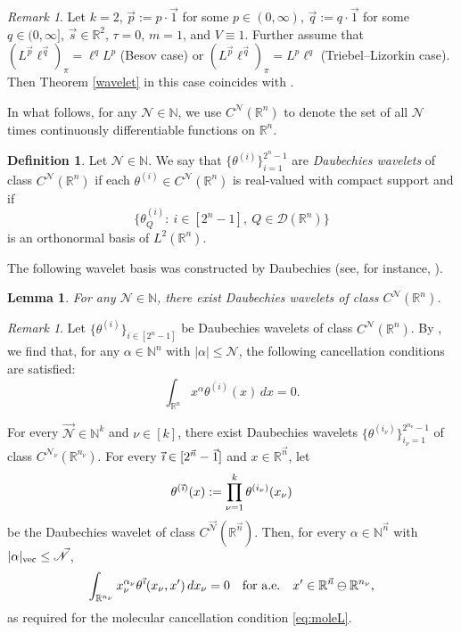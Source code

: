 \documentclass[11pt, reqno]{amsart}
\newtheorem{lemma}[theorem]{Lemma}
\theoremstyle{definition}
\newtheorem{definition}[theorem]{Definition}
\theoremstyle{remark}
\newtheorem{remark}[theorem]{Remark}
\numberwithin{equation}{section}
\newcommand{\R}{\mathbb R}
\newcommand{\vi}{\vec{\textit{\i}}}
\newcommand{\vn}{\vec n}
\newcommand{\vp}{\vec p}
\newcommand{\vq}{\vec q}
\begin{document}
\begin{remark}
Let $k=2$, $\vec p:=p\cdot\vec 1$ for some $p\in(0,\infty)$,
$\vec q:=q\cdot\vec 1$ for some $q\in(0,\infty]$,
$\vec s\in\R^2$, $\tau=0$, $m=1$, and $V\equiv 1$.
Further assume that $(L^{\vp}\ell^{\vq})_\pi =\ell^qL^p$ (Besov case) or
$(L^{\vp}\ell^{\vq})_\pi =L^p\ell^q$ (Triebel--Lizorkin case).
Then Theorem \ref{wavelet} in this case coincides with \cite[Theorem 6.4]{GKP21}.
\end{remark}

In what follows, for any $\mathscr{N}\in\mathbb{N}$,
we use $C^{\mathscr{N}}(\mathbb R^n)$ to denote the set of all
$\mathscr{N}$ times continuously differentiable functions on $\mathbb{R}^n$.

\begin{definition}\label{def Dau}
Let $\mathscr{N}\in\mathbb{N}$. We say that $\{\theta^{(i)}\}_{i=1}^{2^n-1}$
are \emph{Daubechies wavelets} of class $C^{\mathscr N}(\mathbb R^n)$ if each
$\theta^{(i)}\in C^{\mathscr N}(\mathbb R^n)$ is real-valued with compact support and if
$$
\Big\{\theta^{(i)}_Q :\ i\in [2^n-1],\ Q\in\mathscr{D}(\mathbb R^n)\Big\}
$$
is an orthonormal basis of $L^2(\R^n)$.
\end{definition}

The following wavelet basis was constructed by Daubechies
(see, for instance, \cite{D88}).

\begin{lemma}\label{wavelet basis 2}
For any $\mathscr{N}\in\mathbb{N}$,
there exist Daubechies wavelets of class $C^{\mathscr N}(\mathbb R^n)$.
\end{lemma}

\begin{remark}\label{Dau can}
Let $\{\theta^{(i)}\}_{i\in[2^n-1]}$ be Daubechies wavelets of class $C^{\mathscr N}(\mathbb R^n)$.
By \cite[Corollary 5.5.2]{D92}, we find that,
for any $\alpha\in\mathbb{N}^n$ with $|\alpha|\leq\mathscr{N}$,
the following cancellation conditions are satisfied:
$$
\int_{\mathbb{R}^n}x^\alpha\theta^{(i)}(x)\,dx=0.
$$
\end{remark}

For every $\vec{\mathscr N}\in\mathbb{N}^k$ and $\nu\in[k]$,
there exist Daubechies wavelets
$\{\theta^{(i_\nu)}\}_{i_\nu=1}^{2^{n_\nu}-1}$ of class $C^{\mathscr N_\nu}(\mathbb R^{n_\nu})$.
For every $\vi\in[2^{\vn}-\vec1]$
and $x\in \mathbb R^{\vec n}$, let
$$
\theta^{(\vi)}(x)
:=\prod_{\nu=1}^k \theta^{(i_\nu)}(x_\nu)
$$
be the Daubechies wavelet of class $C^{\vec{\mathscr N}}(\mathbb R^{\vn})$.
Then, for every $\alpha\in\mathbb N^{\vec n}$ with $|\alpha|_{\rm{vec}}\leq\vec{\mathscr N}$,
\begin{equation}\label{cancellation}
\int_{\mathbb{R}^{n_\nu}}x_\nu^{\alpha_\nu}\theta^{\vi}(x_\nu,x')\,dx_\nu=0
\quad\text{for a.e.}\quad x'\in\R^{\vn}\ominus\R^{n_\nu},
\end{equation}
as required for the molecular cancellation condition \eqref{eq:moleL}.
\end{document}
